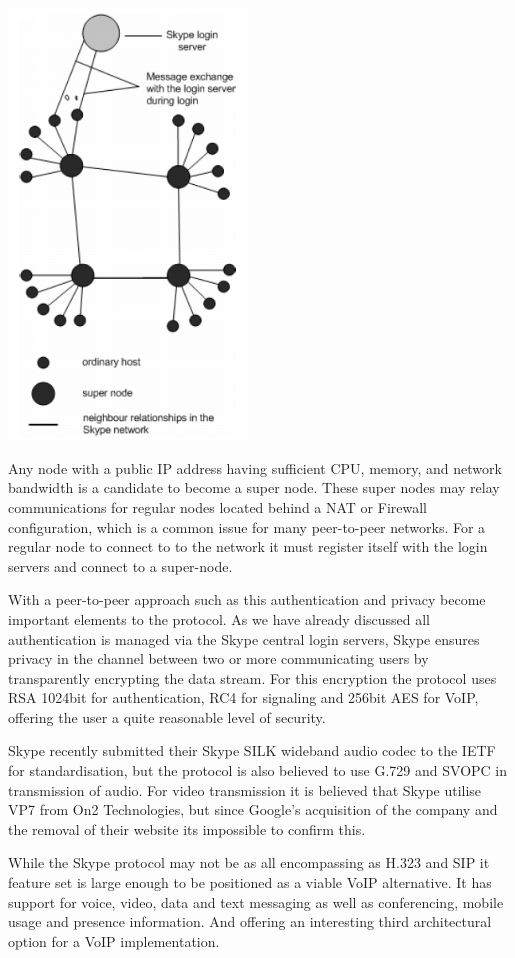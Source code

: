 \begin{center}
	\includegraphics[width=2.5in]{images/Skype_network2.png}
\end{center}

Any node with a public IP address having sufficient CPU, memory, and network bandwidth is a candidate to become a super node\cite{website:BasetSchulzrinne}. These super nodes may relay communications for regular nodes located behind a NAT or Firewall configuration, which is a common issue for many peer-to-peer networks. For a regular node to connect to to the network it must register itself with the login servers and connect to a super-node.

With a peer-to-peer approach such as this authentication and privacy become important elements to the protocol. As we have already discussed all authentication is managed via the Skype central login servers, Skype ensures privacy in the channel between two or more communicating users by transparently encrypting the data stream. For this encryption the protocol uses RSA 1024bit for authentication, RC4 for signaling and 256bit AES for VoIP, offering the user a quite reasonable level of security\cite{website:Fabrice05}. 

Skype recently submitted their Skype SILK wideband audio codec to the IETF for standardisation\cite{website:IETFSILK10}, but the protocol is also believed to use G.729 and SVOPC in transmission of audio. For video transmission it is believed that Skype utilise VP7 from On2 Technologies, but since Google’s acquisition of the company and the removal of their website its impossible to confirm this.

While the Skype protocol may not be as all encompassing as H.323 and SIP it feature set is large enough to be positioned as a viable VoIP alternative. It has support for voice, video, data and text messaging as well as conferencing, mobile usage and presence information. And offering an interesting third architectural option for a VoIP implementation.

